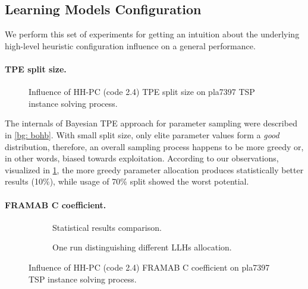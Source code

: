 \subsection{Learning Models Configuration}\label{eval:2:learning models}
We perform this set of experiments for getting an intuition about the underlying high-level heuristic configuration influence on a general performance.

\paragraph{TPE split size.}
\begin{figure}[b]
	\centering
	\vspace{-10pt}
	
	\caption{Influence of HH-PC (code 2.4) TPE split size on pla7397 TSP instance solving process.}
	\vspace{-5pt}
	\label{eval:2:pict:tpe split size}
\end{figure}
The internals of Bayesian TPE approach for parameter sampling were described in \cref{bg: bohb}. With small split size, only elite parameter values form a \emph{good} distribution, therefore, an overall sampling process happens to be more greedy or, in other words, biased towards exploitation. According to our observations, visualized in \cref{eval:2:pict:tpe split size}, the more greedy parameter allocation produces statistically better results (10\%), while usage of 70\% split showed the worst potential.

\paragraph{FRAMAB C coefficient.}
\begin{figure}[t]
	\centering
	\begin{subfigure}{\textwidth}
		\vspace{-10pt}
		
		\caption{Statistical results comparison.}
		\label{eval:2:pict:framab c statistic}
	\end{subfigure}
	\begin{subfigure}{\textwidth}
		
		\vspace{-5pt}
		\caption{One run distinguishing different LLHs allocation.}
		\label{eval:2:pict:framab c one run}
	\end{subfigure}
	\caption{Influence of HH-PC (code 2.4) FRAMAB C coefficient on pla7397 TSP instance solving process.}
	\label{eval:2:pict:framab c}
\end{figure}

